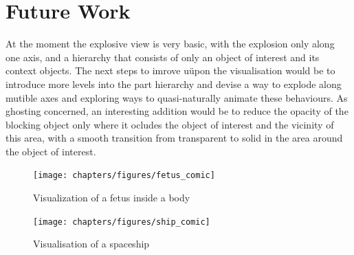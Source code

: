 \section{Future Work}
At the moment the explosive view is very basic, with the explosion only along one axis, and a hierarchy that consists of only  an object of interest and its context objects. The next steps to imrove uüpon the visualisation would be to introduce more levels into the part hierarchy and devise a way to explode along mutible axes and exploring ways to quasi-naturally animate these behaviours. As ghosting concerned, an interesting addition would be to reduce the opacity of the blocking object only where it ocludes the object of interest and the vicinity of this area, with a smooth transition from transparent to solid in the area around the object of interest.\\
\begin{figure}[tb]
	\centering
	\texttt{[image: chapters/figures/fetus\_comic]}
	\caption{Visualization of a fetus inside a body}
	\label{fig:fetus}
\end{figure}
\begin{figure}[tb]
	\centering
	\texttt{[image: chapters/figures/ship\_comic]}
	\caption{Visualisation of a spaceship}
	\label{fig:ship}
\end{figure}